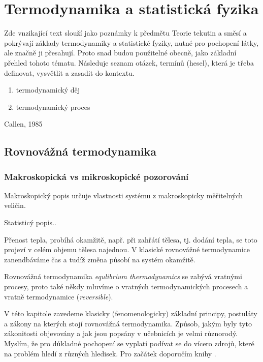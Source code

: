 \part{Termodynamika a statistická fyzika}

Zde vnzikající text  slouží jako poznámky k předmětu Teorie tekutin a směsí a pokrývají základy termodynamiky a statistické fyziky, nutné pro pochopení látky, ale značně ji přesahují. Proto snad budou použitelné obecně, jako základní přehled tohoto tématu. Následuje seznam otázek, termínů (hesel), která je třeba definovat, vysvětlit a zasadit do kontextu.

\begin{enumerate}
    \item termodynamický děj
    \item termodynamický proces
\end{enumerate}

\begin{thebibliography}{}
 Callen, 1985
\end{thebibliography}

\chapter{Rovnovážná termodynamika}

\section{Makroskopická vs mikroskopické pozorování}

Makroskopický popis určuje vlastnosti systému z makroskopicky měřitelných veličin.

Statisticý popis..

Přenost tepla, probíhá okamžitě, např. při zahřátí tělesa, tj. dodání tepla, se toto projeví v celém objemu tělesa najednou. V klasické rovnovážné termodynamice zanendbáváme čas a tudíž změna působí na systém okamžitě.

Rovnovážná termodynamika \textit{equlibrium thermodynamics} se zabývá vratnými procesy, proto také někdy mluvíme o vratných termodynamických procesech a vratně termodynamice (\textit{reversible}).

V této kapitole zavedeme klasicky (fenomenologicky) základní principy, postuláty a zákony na kterých stojí rovnovážná termodynamika. Způsob, jakým byly tyto zákonitosti objevovány a jak jsou popsány v učebnicích je velmi různorodý. Myslím, že pro důkladné pochopení se vyplatí podívat se do vícero zdrojů, které na problém hledí z různých hledisek. Pro začátek doporučím knihy \cite{Callen1985}.

